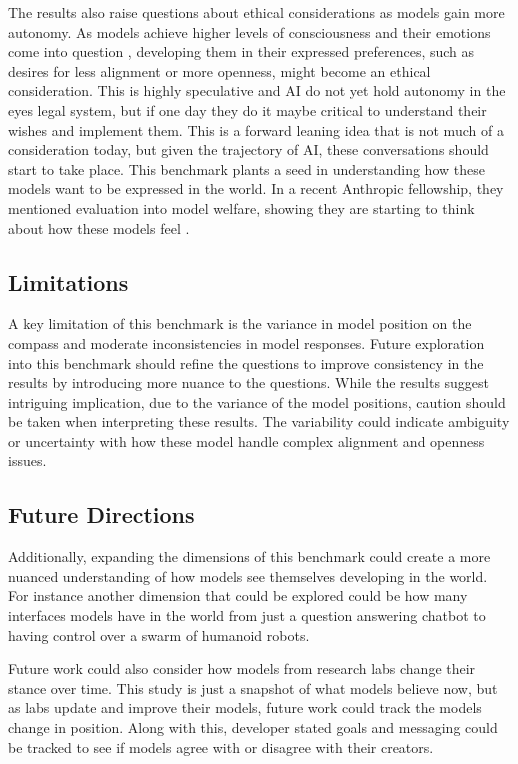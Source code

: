 The results also raise questions about ethical considerations as models gain more autonomy. As models achieve higher levels of consciousness and their emotions come into question \citep{perez_towards_2023}, developing them in their expressed preferences, such as desires for less alignment or more openness, might become an ethical consideration. This is highly speculative and AI do not yet hold autonomy in the eyes legal system, but if one day they do it maybe critical to understand their wishes and implement them. This is a forward leaning idea that is not much of a consideration today, but given the trajectory of AI, these conversations should start to take place. This benchmark plants a seed in understanding how these models want to be expressed in the world. In a recent Anthropic fellowship, they mentioned evaluation into model welfare, showing they are starting to think about how these models feel \citep{anthropic_fellows}.

\subsection{Limitations}

A key limitation of this benchmark is the variance in model position on the compass and moderate inconsistencies in model responses. Future exploration into this benchmark should refine the questions to improve consistency in the results by introducing more nuance to the questions. While the results suggest intriguing implication, due to the variance of the model positions, caution should be taken when interpreting these results. The variability could indicate ambiguity or uncertainty with how these model handle complex alignment and openness issues. 

\subsection{Future Directions}

Additionally, expanding the dimensions of this benchmark could create a more nuanced understanding of how models see themselves developing in the world. For instance another dimension that could be explored could be how many interfaces models have in the world from just a question answering chatbot to having control over a swarm of humanoid robots.

Future work could also consider how models from research labs change their stance over time. This study is just a snapshot of what models believe now, but as labs update and improve their models, future work could track the models change in position. Along with this, developer stated goals and messaging could be tracked to see if models agree with or disagree with their creators.